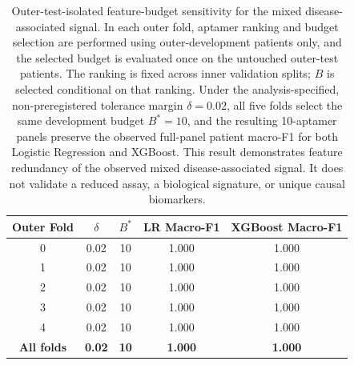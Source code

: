 \begin{table}[H]
\centering
\small
\setlength{\tabcolsep}{6pt}
\renewcommand{\arraystretch}{1.10}

\begin{tabular}{ccccc}
\toprule
\textbf{Outer Fold} & \textbf{$\delta$} & \textbf{$B^*$} & \textbf{LR Macro-F1} & \textbf{XGBoost Macro-F1} \\
\midrule
0 & 0.02 & 10 & 1.000 & 1.000 \\
1 & 0.02 & 10 & 1.000 & 1.000 \\
2 & 0.02 & 10 & 1.000 & 1.000 \\
3 & 0.02 & 10 & 1.000 & 1.000 \\
4 & 0.02 & 10 & 1.000 & 1.000 \\
\midrule
\textbf{All folds} & \textbf{0.02} & \textbf{10} & \textbf{1.000} & \textbf{1.000} \\
\bottomrule
\end{tabular}

\caption{
Outer-test-isolated feature-budget sensitivity for the mixed disease-associated signal. In each
outer fold, aptamer ranking and budget selection are performed using
outer-development patients only, and the selected budget is evaluated once on
the untouched outer-test patients. The ranking is fixed across inner validation
splits; $B$ is selected conditional on that ranking. Under the analysis-specified,
non-preregistered tolerance margin $\delta=0.02$, all five folds select the same development budget
$B^*=10$, and the resulting 10-aptamer panels preserve the observed
full-panel patient macro-F1 for both Logistic Regression and XGBoost.
This result demonstrates feature redundancy of the observed mixed
disease-associated signal. It does not validate a reduced assay, a biological
signature, or unique causal biomarkers.
}
\label{tab:panel_budget}

\end{table}
